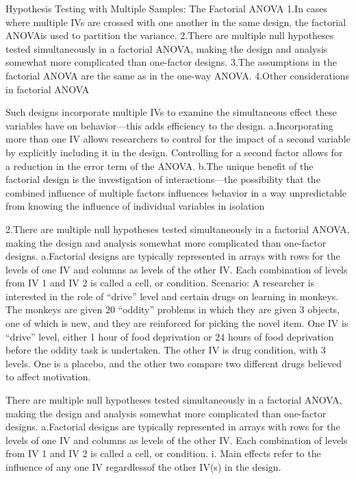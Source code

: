 \documentclass[]{book}
\theoremstyle{definition}
\theoremstyle{definition}
\theoremstyle{definition}
\theoremstyle{remark}
\begin{document}
Hypothesis Testing with Multiple Samples: The Factorial ANOVA 1.In cases
where multiple IVs are crossed with one another in the same design, the
factorial ANOVAis used to partition the variance. 2.There are multiple
null hypotheses tested simultaneously in a factorial ANOVA, making the
design and analysis somewhat more complicated than one-factor designs.
3.The assumptions in the factorial ANOVA are the same as in the one-way
ANOVA. 4.Other considerations in factorial ANOVA

Such designs incorporate multiple IVs to examine the simultaneous effect
these variables have on behavior---this adds efficiency to the design.
a.Incorporating more than one IV allows researchers to control for the
impact of a second variable by explicitly including it in the design.
Controlling for a second factor allows for a reduction in the error term
of the ANOVA. b.The unique benefit of the factorial design is the
investigation of interactions---the possibility that the combined
influence of multiple factors influences behavior in a way unpredictable
from knowing the influence of individual variables in isolation

2.There are multiple null hypotheses tested simultaneously in a
factorial ANOVA, making the design and analysis somewhat more
complicated than one-factor designs. a.Factorial designs are typically
represented in arrays with rows for the levels of one IV and columns as
levels of the other IV. Each combination of levels from IV 1 and IV 2 is
called a cell, or condition. Scenario: A researcher is interested in the
role of ``drive'' level and certain drugs on learning in monkeys. The
monkeys are given 20 ``oddity'' problems in which they are given 3
objects, one of which is new, and they are reinforced for picking the
novel item. One IV is ``drive'' level, either 1 hour of food deprivation
or 24 hours of food deprivation before the oddity task is undertaken.
The other IV is drug condition, with 3 levels. One is a placebo, and the
other two compare two different drugs believed to affect motivation.

There are multiple null hypotheses tested simultaneously in a factorial
ANOVA, making the design and analysis somewhat more complicated than
one-factor designs. a.Factorial designs are typically represented in
arrays with rows for the levels of one IV and columns as levels of the
other IV. Each combination of levels from IV 1 and IV 2 is called a
cell, or condition. i. Main effects refer to the influence of any one IV
regardlessof the other IV(s) in the design.
\end{document}
